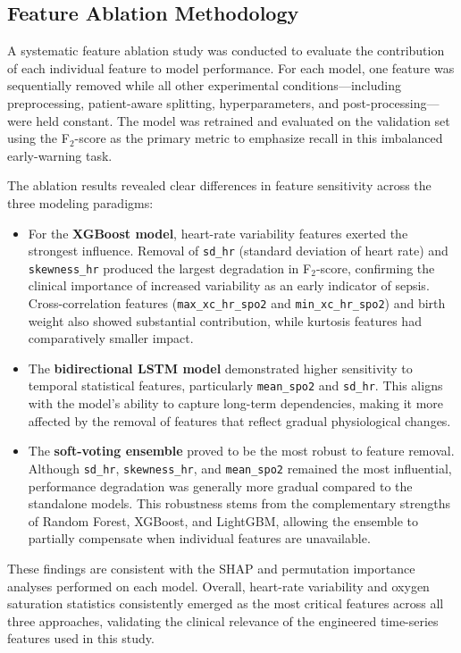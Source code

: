 \documentclass[conference]{IEEEtran}
\begin{document}
\subsection{Feature Ablation Methodology}
 A systematic feature ablation study was conducted to evaluate the contribution of each individual feature to model performance. For each model, one feature was sequentially removed while all other experimental conditions—including preprocessing, patient-aware splitting, hyperparameters, and post-processing—were held constant. The model was retrained and evaluated on the validation set using the F$_2$-score as the primary metric to emphasize recall in this imbalanced early-warning task.

The ablation results revealed clear differences in feature sensitivity across the three modeling paradigms:

\begin{itemize}
    \item For the \textbf{XGBoost model}, heart-rate variability features exerted the strongest influence. Removal of \texttt{sd\_hr} (standard deviation of heart rate) and \texttt{skewness\_hr} produced the largest degradation in F$_2$-score, confirming the clinical importance of increased variability as an early indicator of sepsis. Cross-correlation features (\texttt{max\_xc\_hr\_spo2} and \texttt{min\_xc\_hr\_spo2}) and birth weight also showed substantial contribution, while kurtosis features had comparatively smaller impact.

    \item The \textbf{bidirectional LSTM model} demonstrated higher sensitivity to temporal statistical features, particularly \texttt{mean\_spo2} and \texttt{sd\_hr}. This aligns with the model’s ability to capture long-term dependencies, making it more affected by the removal of features that reflect gradual physiological changes.

    \item The \textbf{soft-voting ensemble} proved to be the most robust to feature removal. Although \texttt{sd\_hr}, \texttt{skewness\_hr}, and \texttt{mean\_spo2} remained the most influential, performance degradation was generally more gradual compared to the standalone models. This robustness stems from the complementary strengths of Random Forest, XGBoost, and LightGBM, allowing the ensemble to partially compensate when individual features are unavailable.
\end{itemize}

These findings are consistent with the SHAP and permutation importance analyses performed on each model. Overall, heart-rate variability and oxygen saturation statistics consistently emerged as the most critical features across all three approaches, validating the clinical relevance of the engineered time-series features used in this study.
\end{document}
